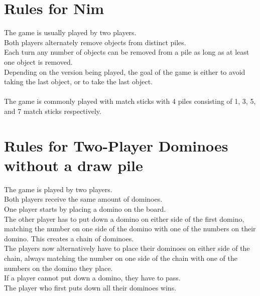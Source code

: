 \documentclass[12pt,a4paper]{article}
\begin{document}



\appendix
\section{Rules for Nim}
\label{a:nimrules}
The game is usually played by two players.  \\
Both players alternately remove objects from distinct piles. \\
Each turn any number of objects can be removed from a pile as long as at least one object is removed. \\
Depending on the version being played, the goal of the game is either to avoid taking the last object, or to take the last object. \\ 
\\
The game is commonly played with match sticks with 4 piles consisting of 1, 3, 5, and 7 match sticks respectively.


\section{Rules for Two-Player Dominoes without a draw pile}
\label{a:domrules}
The game is played by two players. \\
Both players receive the same amount of dominoes. \\
One player starts by placing a domino on the board. \\
The other player has to put down a domino on either side of the first domino, matching the number on one side of the domino with one of the numbers on their domino. This creates a chain of dominoes. \\
The players now alternatively have to place their dominoes on either side of the chain, always matching the number on one side of the chain with one of the numbers on the domino they place. \\
If a player cannot put down a domino, they have to pass. \\
The player who first puts down all their dominoes wins.
\end{document}
